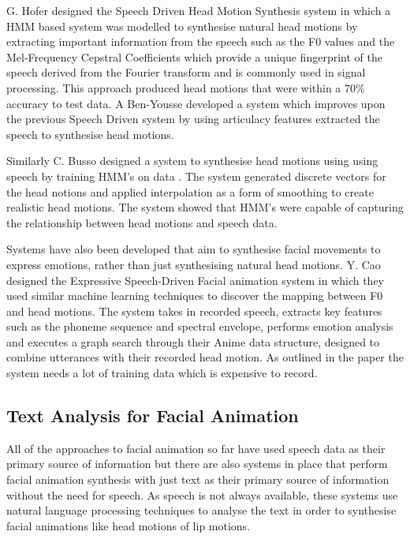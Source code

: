 \documentclass[bsc,frontabs,twoside,singlespacing,parskip,deptreport]{infthesis}
\begin{document}
G. Hofer designed the Speech Driven Head Motion Synthesis system \cite{speech_driven_head_motion} in which a HMM based system was modelled to synthesise natural head motions by extracting important information from the speech such as the F0 values and the Mel-Frequency Cepstral Coefficients which provide a unique fingerprint of the speech derived from the Fourier transform and is commonly used in signal processing. This approach produced head motions that were within a 70\% accuracy to test data. A Ben-Yousse developed a system which improves upon the previous Speech Driven system by using articulacy features extracted the speech\cite{artic1} to synthesise head motions.

Similarly C. Busso designed a system to synthesise head motions using using speech by training HMM's on data \cite{busso_rigid}. The system generated discrete vectors for the head notions and applied interpolation as a form of smoothing to create realistic head motions. The system showed that HMM's were capable of capturing the relationship between head motions and speech data.

Systems have also been developed that aim to synthesise facial movements to express emotions, rather than just synthesising natural head motions. Y. Cao designed the Expressive Speech-Driven Facial animation system  \cite{expressive_speech_animation} in which they used similar machine learning techniques to discover the mapping between F0 and head motions. The system takes in recorded speech, extracts key features such as the phoneme sequence and spectral envelope, performs emotion analysis and executes a graph search through their Anime data structure, designed to combine utterances with their recorded head motion. As outlined in the paper the system needs a lot of training data which is expensive to record. 

\subsection{Text Analysis for Facial Animation}

All of the approaches to facial animation so far have used speech data as their primary source of information but there are also systems in place that perform facial animation synthesis with just text as their primary source of information without the need for speech. As speech is not always available, these systems use natural language processing techniques to analyse the text in order to synthesise facial animations like head motions of lip motions.
\end{document}
